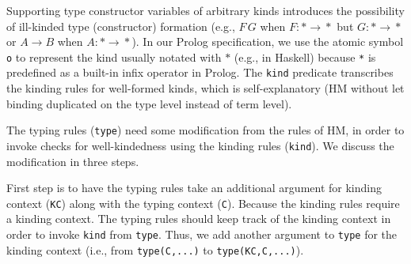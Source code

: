 \documentclass[runningheads,a4paper]{llncs}
\begin{document}
Supporting type constructor variables of
arbitrary kinds introduces the possibility of ill-kinded type (constructor)
formation (e.g., $F\,G$ when $F:*\!\to\!*$ but $G:*\!\to\!*$ \;or\; 
$A\!\to\!B$ when $A:*\!\to\!*$). In our Prolog specification, we use
the atomic symbol \verb|o| to represent the kind usually notated with $*$
(e.g., in Haskell) because \verb|*| is predefined as a built-in infix
operator in Prolog. The \verb|kind| predicate transcribes the kinding rules
for well-formed kinds, which is self-explanatory (HM without let binding
duplicated on the type level instead of term level).

The typing rules (\verb|type|) need some modification from the rules of HM,
in order to invoke checks for well-kindedness using the kinding rules
(\verb|kind|). We discuss the modification in three steps.

First step is to have the typing rules take an additional argument for
kinding context (\verb|KC|) along with the typing context (\verb|C|).
Because the kinding rules require a kinding context. The typing rules
should keep track of the kinding context in order to invoke \verb|kind|
from \verb|type|. Thus, we add another argument to \verb|type| for
the kinding context (i.e., from \verb|type(C,...)| to \verb|type(KC,C,...)|).
\end{document}
